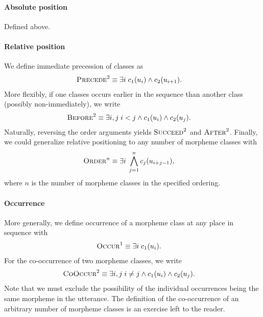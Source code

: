 \paragraph{Absolute position}
Defined above.

\paragraph{Relative position}
We define immediate precession of classes as
\begin{align}
  \textsc{Precede}^2 &\equiv \exists i \; c_1(u_i) \wedge c_2(u_{i+1})
  .
\end{align}
More flexibly, if one classes occurs earlier in the sequence than another class (possibly non-immediately), we write
\begin{align}
  \textsc{Before}^2 &\equiv \exists i,j \; i<j \wedge c_1(u_i) \wedge c_2(u_{j})
  .
\end{align}
Naturally, reversing the order arguments yields $\textsc{Succeed}^2$ and $\textsc{After}^2$.
Finally, we could generalize relative positioning to any number of morpheme classes with
\begin{align}
  \textsc{Order}^n &\equiv \exists i \; \bigwedge_{j=1}^n c_j(u_{i+j-1})
  ,
\end{align}
where $n$ is the number of morpheme classes in the specified ordering.

\paragraph{Occurrence}
More generally, we define occurrence of a morpheme class at any place in sequence with
\begin{align}
  \textsc{Occur}^1 &\equiv \exists i \; c_1(u_i)
  .
\end{align}
For the co-occurrence of two morpheme classes, we write
\begin{align}
  \textsc{CoOccur}^2 &\equiv \exists i,j \; i \neq j \wedge c_1(u_i)\wedge c_2(u_j)
  .
\end{align}
Note that we must exclude the possibility of the individual occurrences being the same morpheme in the utterance.
The definition of the co-occurrence of an arbitrary number of morpheme classes is an exercise left to the reader.

